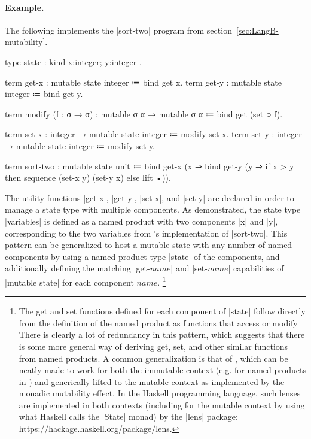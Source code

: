 \paragraph{Example.}
The following implements the \code|sort-two| program from section~\ref{sec:LangB-mutability}.
%
\begin{snippet}
type state : kind { x:integer; y:integer }.

term get-x : mutable state integer ≔ bind get x.
term get-y : mutable state integer ≔ bind get y.

term modify (f : σ → σ) : mutable σ α → mutable σ α
  ≔ bind get (set ○ f).

term set-x : integer → mutable state integer ≔ modify set-x.
term set-y : integer → mutable state integer ≔ modify set-y.

term sort-two : mutable state unit
  ≔ bind get-x (x ⇒
      bind get-y (y ⇒
        if x > y
          then sequence (set-x y) (set-y x)
          else lift •)).
\end{snippet}
%
The utility functions \code|get-x|, \code|get-y|, \code|set-x|, and \code|set-y| are declared in order to manage a state type with multiple components.
As demonstrated, the state type \code|variables| is defined as a named product with two components \code|x| and \code|y|, corresponding to the two variables from \LangB's implementation of \code|sort-two|.
This pattern can be generalized to host a mutable state with any number of named components by using a named product type \code|state| of the components, and additionally defining the matching \code|get-$name$| and \code|set-$name$| capabilities of \code|mutable state| for each component $name$.%
\footnote{
  The get and set functions defined for each component of \code|state| follow directly from the definition of the named product as functions that access or modify
  There is clearly a lot of redundancy in this pattern, which suggests that there is some more general way of deriving get, set, and other similar functions from named products.
  A common generalization is that of , which can be neatly made to work for both the immutable context (e.g. for named products in \LangA) and generically lifted to the mutable context as implemented by the monadic mutability effect.
  In the Haskell programming language, such lenses are implemented in both contexts (including for the mutable context by using what Haskell calls the \code|State| monad) by the \code|lens| package: https://hackage.haskell.org/package/lens.
}

